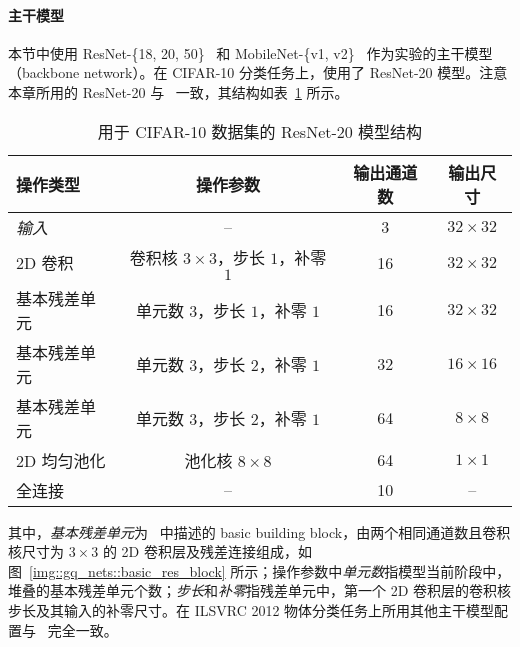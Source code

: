
\paragraph{主干模型}
本节中使用 ResNet-\{18, 20, 50\}~\citep{He_2016} 和 MobileNet-\{v1, v2\}~\citep{howard2017mobilenets, Sandler_2018} 作为实验的主干模型（backbone network）。在 CIFAR-10 分类任务上，使用了 ResNet-20 模型。注意本章所用的 ResNet-20 与~\citet{zhou2016dorefanet, choi2018pact, li2019additive} 一致，其结构如表~\ref{tab::gq_nets::res20} 所示。

\begin{table}[htb]
  \centering
  \caption{用于 CIFAR-10 数据集的 ResNet-20 模型结构}
  \label{tab::gq_nets::res20}
  \begin{tabular}{l*{3}{c}}
    \toprule
    操作类型 & 操作参数 & 输出通道数 & 输出尺寸 \\
    \midrule
    \emph{输入} & -- & 3 & $32\times32$ \\
    2D 卷积 & 卷积核 $3\times 3$，步长 $1$，补零 $1$ & 16 & $32\times 32$ \\
    基本残差单元 & 单元数 $3$，步长 $1$，补零 $1$ & 16 & $32\times 32$ \\
    基本残差单元 & 单元数 $3$，步长 $2$，补零 $1$ & 32 & $16\times 16$ \\
    基本残差单元 & 单元数 $3$，步长 $2$，补零 $1$ & 64 & $8\times 8$ \\
    2D 均匀池化 & 池化核 $8\times 8$ & 64 & $1\times 1$ \\
    全连接 & -- & 10 & -- \\
    \bottomrule
  \end{tabular}
\end{table}

其中，\emph{基本残差单元}为~\citet{He_2016} 中描述的 basic building block，由两个相同通道数且卷积核尺寸为 $3\times 3$ 的 2D 卷积层及残差连接组成，如图~\ref{img::gq_nets::basic_res_block} 所示；操作参数中\emph{单元数}指模型当前阶段中，堆叠的基本残差单元个数；\emph{步长}和\emph{补零}指残差单元中，第一个 2D 卷积层的卷积核步长及其输入的补零尺寸。在 ILSVRC 2012 物体分类任务上所用其他主干模型配置与~\citet{He_2016,howard2017mobilenets,Sandler_2018} 完全一致。


